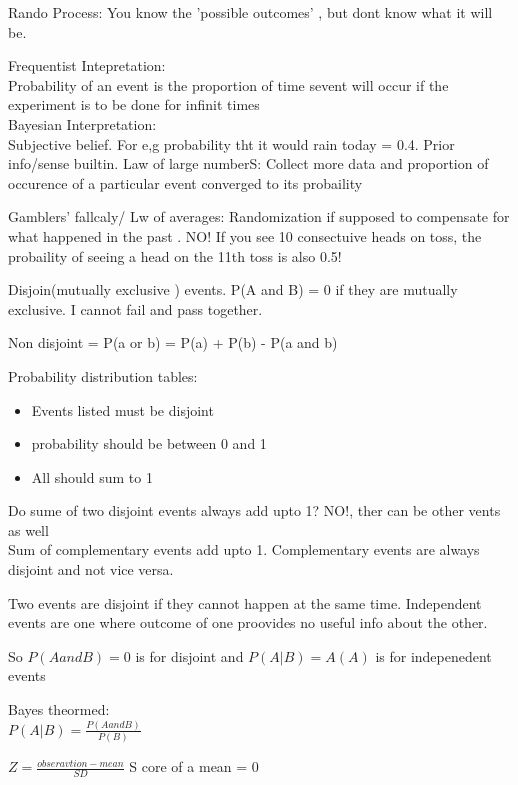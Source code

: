 \documentclass[a4paper]{article}
\begin{document}
Rando Process: You know the 'possible outcomes' , but dont know what it will be.

Frequentist Intepretation:\\
Probability of an event is the proportion of time sevent will occur if the experiment is to be done for infinit times\\

Bayesian Interpretation:\\
Subjective belief. For e,g probability tht it would rain today = 0.4. Prior info/sense builtin.
 Law of large numberS: Collect more data and proportion of occurence of a particular event converged to its probaility
 
 Gamblers' fallcaly/ Lw of averages: Randomization if supposed to compensate for what happened in the past . NO! If you see 10 consectuive heads on toss, the probaility of seeing a head on the 11th toss is also 0.5!
 
 Disjoin(mutually exclusive ) events. P(A and B) = 0 if they are mutually exclusive. I cannot fail and pass together.
 
 Non disjoint = P(a or b) = P(a) + P(b) - P(a and b)
 
 Probability distribution tables:
 \begin{itemize}
\item Events listed must be disjoint
\item probability should be between 0 and 1
\item All should sum to 1	


\end{itemize}

Do sume of two disjoint events always add upto 1? NO!, ther can be other vents as well
\\
Sum of complementary events add upto 1. Complementary events are always disjoint and not vice versa.

 
Two events are disjoint if they cannot happen at the same time. Independent events are one where outcome of one proovides no useful info about the other.

So $P(A and B)=0$ is for disjoint 
and $P(A|B) = A(A)$ is for indepenedent events

Bayes theormed: \\
\begin{math}
P(A|B) = \frac{P(A and B)}{P(B)}
\end{math}

\begin{math}
Z = \frac{obseravtion -mean}{SD}
\end{math}
S core of a mean = 0	
\end{document}
